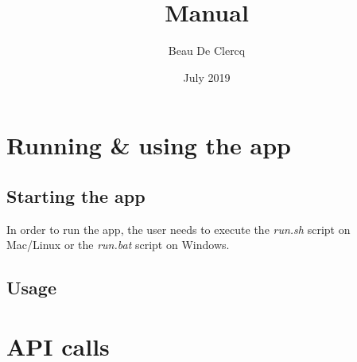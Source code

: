 \documentclass[12pt]{article}
\title{Manual}
\author{Beau De Clercq}
\date{July 2019}
\begin{document}
\maketitle{}

\tableofcontents

\clearpage
\newpage

\section{Running \& using the app}
\subsection{Starting the app}
In order to run the app, the user needs to execute the \emph{run.sh} script on Mac/Linux or the \emph{run.bat} script on Windows.

\subsection{Usage}


\newpage

\section{API calls}
\end{document}
